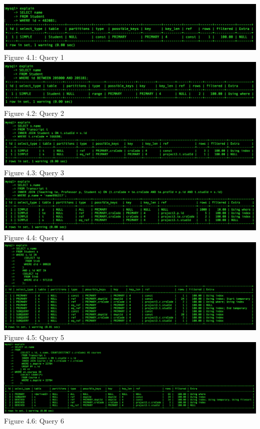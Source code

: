\documentclass[11pt]{report}
\begin{document}
		\begin{center}
			\includegraphics[scale=0.5]{Ea1.PNG}\\
			Figure 4.1: Query 1\\
			\includegraphics[scale=0.485]{Ea2.PNG}\\
			Figure 4.2: Query 2\\
			\includegraphics[scale=0.438]{Ea3.PNG}\\
			Figure 4.3: Query 3\\
			\includegraphics[scale=0.435]{Ea4.PNG}\\
			Figure 4.4: Query 4\\
			\includegraphics[scale=0.388]{Ea5.PNG}\\
			Figure 4.5: Query 5\\
			\includegraphics[scale=0.35]{Ea6.PNG}\\
			Figure 4.6: Query 6\\
		\end{center}	
\end{document}
